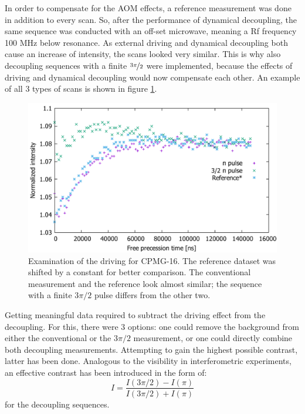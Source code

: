 \documentclass[12pt,a4paper]{article}
\begin{document}
In order to compensate for the AOM effects, a reference measurement was done in addition to every scan. So, after the performance of dynamical decoupling, the same sequence was conducted with an off-set microwave, meaning a Rf frequency 100 MHz below resonance. As external driving and dynamical decoupling both cause an increase of intensity, the scans looked very similar. This is why also decoupling sequences with a finite $\nicefrac{3\pi}{2}$ were implemented, because the effects of driving and dynamical decoupling would now compensate each other. An example of all 3 types of scans is shown in figure \ref{cr}.\\
\begin{figure}[H]
\includegraphics[scale=0.6]{cref.pdf} 
\caption{Examination of the driving for CPMG-16. The reference dataset was shifted by a constant for better comparison. The conventional measurement and the reference look almost similar; the sequence with a finite $3\pi/2$ pulse differs from the other two.}
\label{cr}
\end{figure}
Getting meaningful data required to subtract the driving effect from the decoupling. For this, there were 3 options: one could remove the background from either the conventional or the $3\pi/2$ measurement, or one could directly combine both decoupling measurements. Attempting to gain the highest possible contrast, latter has been done. Analogous to the visibility in interferometric experiments, an effective contrast has been introduced in the form of:
\begin{equation}
I=\frac{I(3\pi/2)-I(\pi)}{I(3\pi/2)+I(\pi)}
\end{equation}
for the decoupling sequences. 
\end{document}
